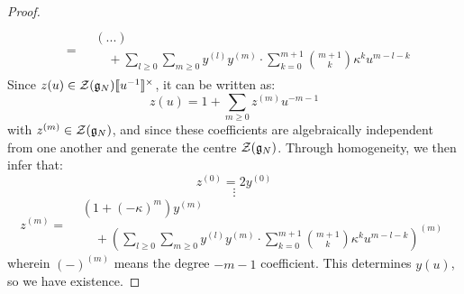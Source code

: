 \begin{proof}
$$\begin{aligned}
                                \\
                                & =
                                \begin{aligned}
                                    & (...)
                                    \\
                                    & \quad + \sum_{l \geq 0} \sum_{m \geq 0} y^{(l)} y^{(m)} \cdot \sum_{k = 0}^{m + 1} \binom{m + 1}{k} \kappa^k u^{m - l - k}
                                \end{aligned}
                            \end{aligned}
                        $$
                    Since $z(u) \in \calZ(\g_N)[\![u^{-1}]\!]^{\x}$, it can be written as:
                        $$z(u) = 1 + \sum_{m \geq 0} z^{(m)} u^{-m - 1}$$
                    with $z^{(m)} \in \mathcal{Z}(\mathfrak{g}_N)$, and since these coefficients are algebraically independent from one another and generate the centre $\mathcal{Z}(\mathfrak{g}_N)$. Through homogeneity, we then infer that:
                        $$z^{(0)} = 2y^{(0)}$$
                        $$\vdots$$
                        $$
                            z^{(m)} =
                            \begin{aligned}
                                & (1 + (-\kappa)^m) y^{(m)}
                                \\
                                & \quad + \left( \sum_{l \geq 0} \sum_{m \geq 0} y^{(l)} y^{(m)} \cdot \sum_{k = 0}^{m + 1} \binom{m + 1}{k} \kappa^k u^{m - l - k} \right)^{(m)} 
                            \end{aligned}
                        $$
                    wherein $(-)^{(m)}$ means the degree $-m - 1$ coefficient. This determines $y(u)$, so we have existence.


\end{proof}
